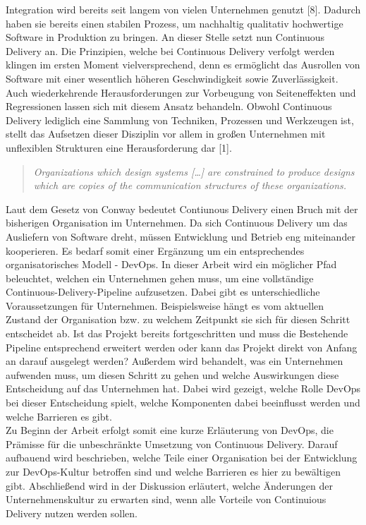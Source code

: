 
 Integration wird bereits seit langem von vielen Unternehmen genutzt [8]. Dadurch haben sie bereits einen stabilen Prozess, um nachhaltig qualitativ hochwertige Software in Produktion zu bringen. An dieser Stelle setzt nun Continuous Delivery an. Die Prinzipien, welche bei Continuous Delivery verfolgt werden klingen im ersten Moment vielversprechend, denn es ermöglicht das Ausrollen von Software mit einer wesentlich höheren Geschwindigkeit sowie Zuverlässigkeit. Auch wiederkehrende Herausforderungen zur Vorbeugung von Seiteneffekten und Regressionen lassen sich mit diesem Ansatz behandeln. Obwohl Continuous Delivery lediglich eine Sammlung von Techniken, Prozessen und Werkzeugen ist, stellt das Aufsetzen dieser Disziplin vor allem in großen Unternehmen mit unflexiblen Strukturen eine Herausforderung dar [1]. 

\begin{quote} \textit{\glqq Organizations which design systems […] are constrained to produce designs which are copies of the communication structures of these organizations. \grqq~}\cite[S.5]{Farley.2011} \end{quote} 

Laut dem Gesetz von Conway bedeutet Contiunous Delivery einen Bruch mit der bisherigen Organisation im Unternehmen. Da sich Continuous Delivery um das Ausliefern von Software dreht, müssen Entwicklung und Betrieb eng miteinander kooperieren. Es bedarf somit einer Ergänzung um ein entsprechendes organisatorisches Modell - DevOps. In dieser Arbeit wird ein möglicher Pfad beleuchtet, welchen ein Unternehmen gehen muss, um eine vollständige Continuous-Delivery-Pipeline aufzusetzen. Dabei gibt es unterschiedliche Voraussetzungen für Unternehmen. Beispielsweise hängt es vom aktuellen Zustand der Organisation bzw. zu welchem Zeitpunkt sie sich für diesen Schritt entscheidet ab. Ist das Projekt bereits fortgeschritten und muss die Bestehende Pipeline entsprechend erweitert werden oder kann das Projekt direkt von Anfang an darauf ausgelegt werden? Außerdem wird behandelt, was ein Unternehmen aufwenden muss, um diesen Schritt zu gehen und welche Auswirkungen diese Entscheidung auf das Unternehmen hat. Dabei wird gezeigt, welche Rolle DevOps bei dieser Entscheidung spielt, welche Komponenten dabei beeinflusst werden und welche Barrieren es gibt. \\ Zu Beginn der Arbeit erfolgt somit eine kurze Erläuterung von DevOps, die Prämisse für die unbeschränkte Umsetzung von Continuous Delivery. Darauf aufbauend wird beschrieben, welche Teile einer Organisation bei der Entwicklung zur DevOps-Kultur betroffen sind und welche Barrieren es hier zu bewältigen gibt. Abschließend wird in der Diskussion erläutert, welche Änderungen der Unternehmenskultur zu erwarten sind, wenn alle Vorteile von Continuious Delivery nutzen werden sollen.

